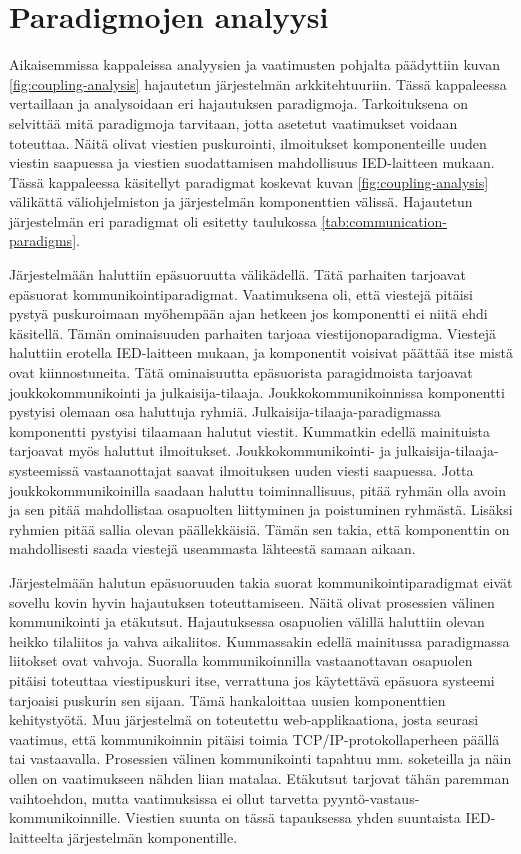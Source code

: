 \section{Paradigmojen analyysi}
Aikaisemmissa kappaleissa analyysien ja vaatimusten pohjalta päädyttiin kuvan \ref{fig:coupling-analysis} hajautetun järjestelmän arkkitehtuuriin. Tässä kappaleessa vertaillaan ja analysoidaan eri hajautuksen paradigmoja. Tarkoituksena on selvittää mitä paradigmoja tarvitaan, jotta asetetut vaatimukset voidaan toteuttaa. Näitä olivat viestien puskurointi, ilmoitukset komponenteille uuden viestin saapuessa ja viestien suodattamisen mahdollisuus IED-laitteen mukaan. Tässä kappaleessa käsitellyt paradigmat koskevat kuvan \ref{fig:coupling-analysis} välikättä väliohjelmiston ja järjestelmän komponenttien välissä. Hajautetun järjestelmän eri paradigmat oli esitetty taulukossa \ref{tab:communication-paradigms}.

Järjestelmään haluttiin epäsuoruutta välikädellä. Tätä parhaiten tarjoavat epäsuorat kommunikointiparadigmat. Vaatimuksena oli, että viestejä pitäisi pystyä puskuroimaan myöhempään ajan hetkeen jos komponentti ei niitä ehdi käsitellä. Tämän ominaisuuden parhaiten tarjoaa viestijonoparadigma. Viestejä haluttiin erotella IED-laitteen mukaan, ja komponentit voisivat päättää itse mistä ovat kiinnostuneita. Tätä ominaisuutta epäsuorista paragidmoista tarjoavat joukkokommunikointi ja julkaisija-tilaaja. Joukkokommunikoinnissa komponentti pystyisi olemaan osa haluttuja ryhmiä. Julkaisija-tilaaja-paradigmassa komponentti pystyisi tilaamaan halutut viestit. Kummatkin edellä mainituista tarjoavat myös haluttut ilmoitukset. Joukkokommunikointi- ja julkaisija-tilaaja-systeemissä vastaanottajat saavat ilmoituksen uuden viesti saapuessa. Jotta joukkokommunikoinilla saadaan haluttu toiminnallisuus, pitää ryhmän olla avoin ja sen pitää mahdollistaa osapuolten liittyminen ja poistuminen ryhmästä. Lisäksi ryhmien pitää sallia olevan päällekkäisiä. Tämän sen takia, että komponenttin on mahdollisesti saada viestejä useammasta lähteestä samaan aikaan.

Järjestelmään halutun epäsuoruuden takia suorat kommunikointiparadigmat eivät sovellu kovin hyvin hajautuksen toteuttamiseen. Näitä olivat prosessien välinen kommunikointi ja etäkutsut. Hajautuksessa osapuolien välillä haluttiin olevan heikko tilaliitos ja vahva aikaliitos. Kummassakin edellä mainitussa paradigmassa liitokset ovat vahvoja. Suoralla kommunikoinnilla vastaanottavan osapuolen pitäisi toteuttaa viestipuskuri itse, verrattuna jos käytettävä epäsuora systeemi tarjoaisi puskurin sen sijaan. Tämä hankaloittaa uusien komponenttien kehitystyötä. Muu järjestelmä on toteutettu web-applikaationa, josta seurasi vaatimus, että kommunikoinnin pitäisi toimia TCP/IP-protokollaperheen päällä tai vastaavalla. Prosessien välinen kommunikointi tapahtuu mm. soketeilla ja näin ollen on vaatimukseen nähden liian matalaa. Etäkutsut tarjovat tähän paremman vaihtoehdon, mutta vaatimuksissa ei ollut tarvetta pyyntö-vastaus-kommunikoinnille. Viestien suunta on tässä tapauksessa yhden suuntaista IED-laitteelta järjestelmän komponentille.


